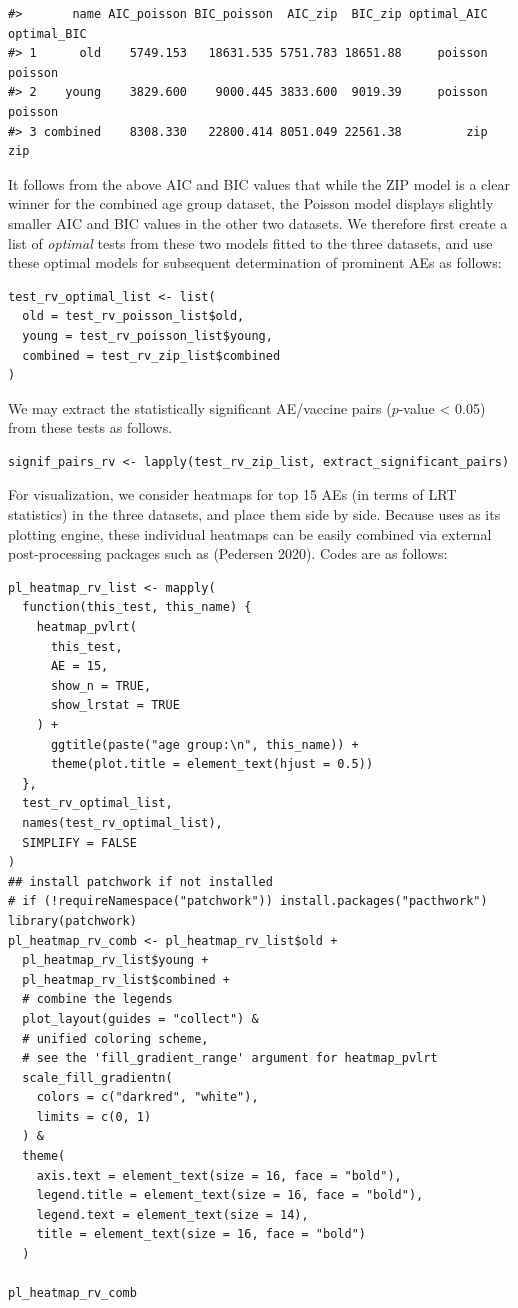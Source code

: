 \begin{verbatim}
#>       name AIC_poisson BIC_poisson  AIC_zip  BIC_zip optimal_AIC optimal_BIC
#> 1      old    5749.153   18631.535 5751.783 18651.88     poisson     poisson
#> 2    young    3829.600    9000.445 3833.600  9019.39     poisson     poisson
#> 3 combined    8308.330   22800.414 8051.049 22561.38         zip         zip
\end{verbatim}

It follows from the above AIC and BIC values that while the ZIP model is a clear winner for the combined age group dataset, the Poisson model displays slightly smaller AIC and BIC values in the other two datasets. We therefore first create a list of \emph{optimal} tests from these two models fitted to the three datasets, and use these optimal models for subsequent determination of prominent AEs as follows:

\begin{verbatim}
test_rv_optimal_list <- list(
  old = test_rv_poisson_list$old,
  young = test_rv_poisson_list$young,
  combined = test_rv_zip_list$combined
)
\end{verbatim}

\noindent We may extract the statistically significant AE/vaccine pairs (\(p\)-value \textless{} 0.05) from these tests as follows.

\begin{verbatim}
signif_pairs_rv <- lapply(test_rv_zip_list, extract_significant_pairs) 
\end{verbatim}

For visualization, we consider heatmaps for top 15 AEs (in terms of LRT statistics) in the three datasets, and place them side by side. Because  uses  as its plotting engine, these individual heatmaps can be easily combined via external  post-processing packages such as  (Pedersen 2020). Codes are as follows:

\begin{verbatim}
pl_heatmap_rv_list <- mapply(
  function(this_test, this_name) {
    heatmap_pvlrt(
      this_test,
      AE = 15,
      show_n = TRUE,
      show_lrstat = TRUE
    ) + 
      ggtitle(paste("age group:\n", this_name)) + 
      theme(plot.title = element_text(hjust = 0.5))
  },
  test_rv_optimal_list,
  names(test_rv_optimal_list),
  SIMPLIFY = FALSE
)
## install patchwork if not installed
# if (!requireNamespace("patchwork")) install.packages("pacthwork")
library(patchwork)
pl_heatmap_rv_comb <- pl_heatmap_rv_list$old + 
  pl_heatmap_rv_list$young + 
  pl_heatmap_rv_list$combined + 
  # combine the legends
  plot_layout(guides = "collect") & 
  # unified coloring scheme, 
  # see the 'fill_gradient_range' argument for heatmap_pvlrt
  scale_fill_gradientn(
    colors = c("darkred", "white"), 
    limits = c(0, 1)
  ) &
  theme(
    axis.text = element_text(size = 16, face = "bold"),
    legend.title = element_text(size = 16, face = "bold"),
    legend.text = element_text(size = 14),
    title = element_text(size = 16, face = "bold")
  )

pl_heatmap_rv_comb
\end{verbatim}

